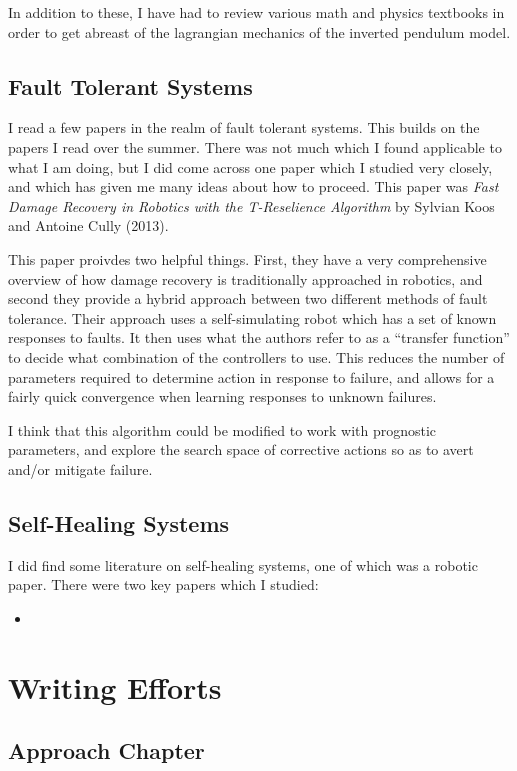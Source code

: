 \documentclass[12pt]{article}
\begin{document}
In addition to these, I have had to review various math and physics
textbooks in order to get abreast of the lagrangian mechanics of the
inverted pendulum model.

\subsection{Fault Tolerant Systems}
I read a few papers in the realm of fault tolerant systems.  This
builds on the papers I read over the summer.  There was not much which
I found applicable to what I am doing, but I did come across one paper
which I studied very closely, and which has given me many ideas about
how to proceed.  This paper was {\em Fast Damage Recovery in Robotics
  with the T-Reselience Algorithm} by Sylvian Koos and Antoine Cully
(2013).

This paper proivdes two helpful things.  First, they have a very
comprehensive overview of how damage recovery is traditionally
approached in robotics, and second they provide a hybrid approach
between two different methods of fault tolerance.  Their approach uses
a self-simulating robot which has a set of known responses to faults.
It then uses what the authors refer to as a ``transfer function'' to
decide what combination of the controllers to use.  This reduces the
number of parameters required to determine action in response to
failure, and allows for a fairly quick convergence when learning
responses to unknown failures.

I think that this algorithm could be modified to work with prognostic
parameters, and explore the search space of corrective actions so as
to avert and/or mitigate failure.


\subsection{Self-Healing Systems}
I did find some literature on self-healing systems, one of which was a
robotic paper.  There were two key papers which I studied:
\begin{itemize}
\item
\end{itemize}

\section{Writing Efforts}
\subsection{Approach Chapter}
\end{document}

